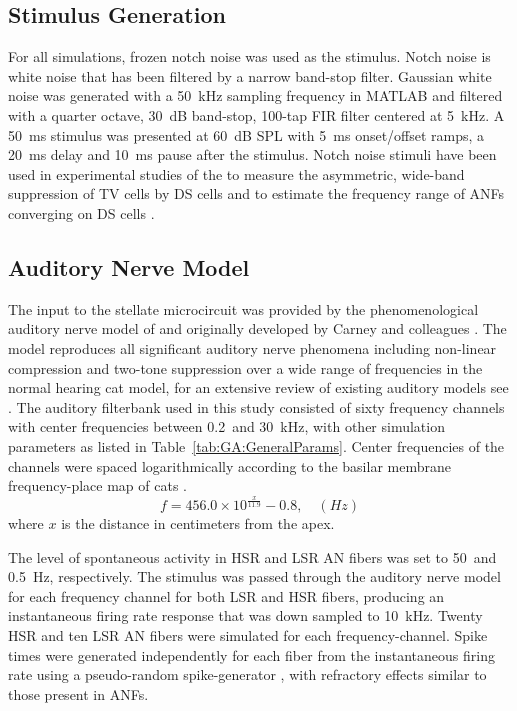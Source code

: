 \subsection{Stimulus Generation}\label{sec:GA:stimulus-generation}

For all simulations, frozen notch noise was used as the
stimulus. Notch noise is white noise that has been filtered by a
narrow band-stop filter. Gaussian white noise was generated with a
50~kHz sampling frequency in MATLAB and filtered with a quarter
octave, 30~dB band-stop, 100-tap FIR filter centered at 5~kHz. A 50~ms
stimulus was presented at 60~dB SPL with 5~ms onset/offset ramps, a
20~ms delay and 10~ms pause after the stimulus. Notch noise stimuli
have been used in experimental studies of the {\CN} to measure the
asymmetric, wide-band suppression of TV cells by DS cells
\citep{ReissYoung:2005} and to estimate the frequency range of ANFs
converging on DS cells \citep{PalmerJiangEtAl:1996}.

\subsection{Auditory Nerve Model}\label{sec:GA:auditory-nerve-model}

The input to the stellate microcircuit was provided by the
phenomenological auditory nerve model of \citet{HeinzZhangEtAl:2001}
and originally developed by Carney and colleagues
\citep{Carney:1993,ZhangCarney:2001}. The model reproduces all
significant auditory nerve phenomena including non-linear compression
and two-tone suppression over a wide range of frequencies in the
normal hearing cat model, for an extensive review of existing auditory
models see \citet{Lopez-Poveda:2005}. The auditory filterbank used in
this study consisted of sixty frequency channels with center
frequencies between 0.2~and 30~kHz, with other simulation parameters
as listed in Table~\ref{tab:GA:GeneralParams}. Center frequencies of
the channels were spaced logarithmically according to the basilar
membrane frequency-place map of cats \citep[See Table ]{Greenwood:1990}. 
\begin{equation} \label{eq:GA:Greenwood} 
f=456.0\times 10^{\frac{x}{11.9} } -0.8, \quad (Hz)
\end{equation}
\noindent where $x$ is the distance in centimeters from the apex.
\smallskip{}

The level
of spontaneous activity in HSR and LSR AN fibers was set to 50~and
0.5~Hz, respectively. The stimulus was passed through the auditory
nerve model for each frequency channel for both LSR and HSR fibers,
producing an instantaneous firing rate response that was down sampled
to 10~kHz. Twenty HSR and ten LSR AN fibers were simulated for each
frequency-channel. Spike times were generated independently for each
fiber from the instantaneous firing rate using a pseudo-random
spike-generator \citep{JacksonCarney:2005}, with refractory effects
similar to those present in ANFs.

